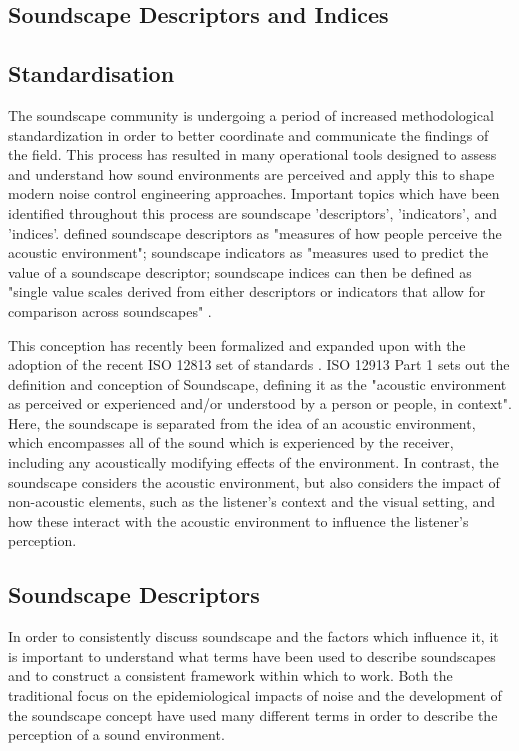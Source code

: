\subsection{Soundscape Descriptors and Indices}


\subsection{Standardisation}
The soundscape community is undergoing a period of increased methodological standardization in order to better coordinate and communicate the findings of the field. This process has resulted in many operational tools designed to assess and understand how sound environments are perceived and apply this to shape modern noise control engineering approaches. Important topics which have been identified throughout this process are soundscape 'descriptors', 'indicators', and 'indices'. \citet{Aletta2016Soundscape} defined soundscape descriptors as "measures of how people perceive the acoustic environment"; soundscape indicators as "measures used to predict the value of a soundscape descriptor; soundscape indices can then be defined as "single value scales derived from either descriptors or indicators that allow for comparison across soundscapes" \citep{Kang2019Towards}.

This conception has recently been formalized and expanded upon with the adoption of the recent ISO 12813 set of standards \citep{ISO12913Part1, ISO12913Part2,ISO12913Part3}. ISO 12913 Part 1 sets out the definition and conception of Soundscape, defining it as the "acoustic environment as perceived or experienced and/or understood by a person or people, in context". Here, the soundscape is separated from the idea of an acoustic environment, which encompasses all of the sound which is experienced by the receiver, including any acoustically modifying effects of the environment. In contrast, the soundscape considers the acoustic environment, but also considers the impact of non-acoustic elements, such as the listener's context and the visual setting, and how these interact with the acoustic environment to influence the listener's perception.

\subsection{Soundscape Descriptors}
In order to consistently discuss soundscape and the factors which influence it, it is important to understand what terms have been used to describe soundscapes and to construct a consistent framework within which to work. Both the traditional focus on the epidemiological impacts of noise and the development of the soundscape concept have used many different terms in order to describe the perception of a sound environment.

